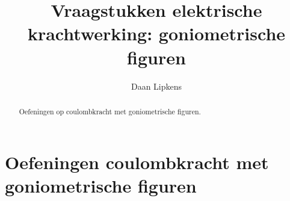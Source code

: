 \documentclass{ximera}
\title{Vraagstukken elektrische krachtwerking: goniometrische figuren}
\author{Daan Lipkens}
\begin{document}
\begin{abstract}
    Oefeningen op coulombkracht met goniometrische figuren.
\end{abstract}
\maketitle
\section{Oefeningen coulombkracht met goniometrische figuren}

        
\end{document}

